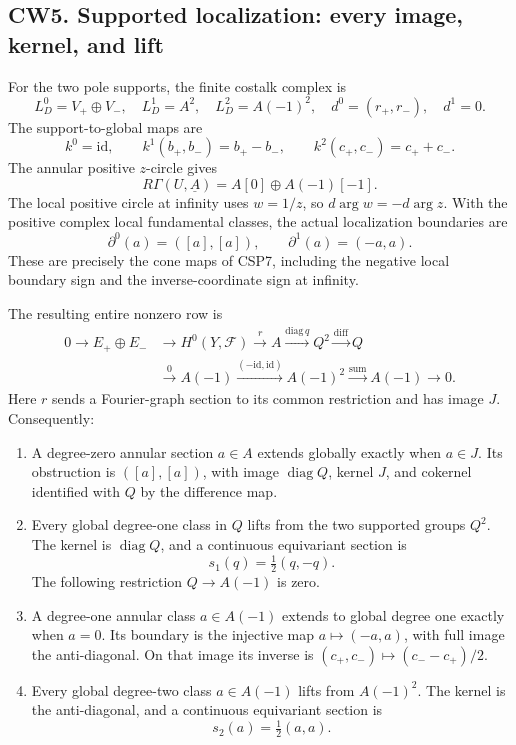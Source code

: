 \subsection{CW5. Supported localization: every image, kernel, and
lift}\label{cw5.-supported-localization-every-image-kernel-and-lift}

For the two pole supports, the finite costalk complex is \[
L_D^0=V_+\oplus V_-,\quad L_D^1=A^2,\quad
L_D^2=A(-1)^2,\quad
d^0=(r_+,r_-),\quad d^1=0.
\] The support-to-global maps are \[
k^0=\mathrm{id},\qquad
k^1(b_+,b_-)=b_+-b_-,\qquad
k^2(c_+,c_-)=c_++c_-.
\tag{CW5.1}
\] The annular positive \(z\)-circle gives \[
R\Gamma(U,\underline A)=A[0]\oplus A(-1)[-1].
\] The local positive circle at infinity uses \(w=1/z\), so
\(d\arg w=-d\arg z\). With the positive complex local fundamental
classes, the actual localization boundaries are \[
\partial^0(a)=([a],[a]),\qquad
\partial^1(a)=(-a,a).
\tag{CW5.2}
\] These are precisely the cone maps of CSP7, including the negative
local boundary sign and the inverse-coordinate sign at infinity.

The resulting entire nonzero row is \[
\begin{aligned}
0\to E_+\oplus E_-&\to H^0(Y,\mathscr F)
\xrightarrow r A
\xrightarrow{\mathrm{diag}\,q}Q^2
\xrightarrow{\mathrm{diff}}Q\\
&\xrightarrow0 A(-1)
\xrightarrow{(-\mathrm{id},\mathrm{id})}A(-1)^2
\xrightarrow{\mathrm{sum}}A(-1)\to0.
\end{aligned}
\tag{CW5.3}
\] Here \(r\) sends a Fourier-graph section to its common restriction
and has image \(J\). Consequently:

\begin{enumerate}
\def\labelenumi{\arabic{enumi}.}
\tightlist
\item
  A degree-zero annular section \(a\in A\) extends globally exactly when
  \(a\in J\). Its obstruction is \(([a],[a])\), with image
  \(\operatorname{diag}Q\), kernel \(J\), and cokernel identified with
  \(Q\) by the difference map.
\item
  Every global degree-one class in \(Q\) lifts from the two supported
  groups \(Q^2\). The kernel is \(\operatorname{diag}Q\), and a
  continuous equivariant section is \[
  s_1(q)=\tfrac12(q,-q).
  \tag{CW5.4}
  \] The following restriction \(Q\to A(-1)\) is zero.
\item
  A degree-one annular class \(a\in A(-1)\) extends to global degree one
  exactly when \(a=0\). Its boundary is the injective map
  \(a\mapsto(-a,a)\), with full image the anti-diagonal. On that image
  its inverse is \((c_+,c_-)\mapsto(c_--c_+)/2\).
\item
  Every global degree-two class \(a\in A(-1)\) lifts from \(A(-1)^2\).
  The kernel is the anti-diagonal, and a continuous equivariant section
  is \[
  s_2(a)=\tfrac12(a,a).
  \tag{CW5.5}
  \]
\end{enumerate}

